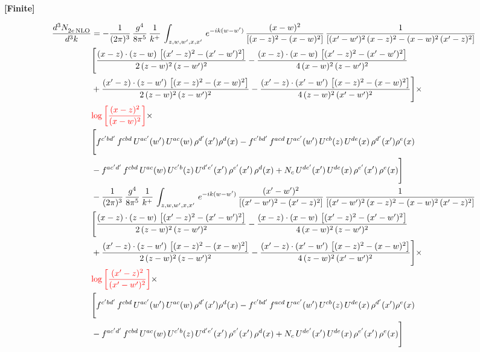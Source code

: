 \documentclass[9pt]{article}
\numberwithin{equation}{section}
\begin{document}
\par\smallskip\noindent\textbf{[Finite]}\par\nobreak
\begin{align}
 \frac{d^{3}N_{2e\,\rm NLO}^{\rm}}{d^{3}k}  & =   -\frac{1}{(2\pi)^{3}}\, \frac{g^{4}}{8\pi^{5}}\,\frac{1}{k^{+}}\,\int_{z,w,w^{\prime},x,x'}\, e^{-ik(w-w^{\prime})}\,\frac{(x-w)^{2}}{\left[(x-z)^{2}-(x-w)^{2}\right]}\, \frac{1}{\left[(x'-w')^{2}\, (x-z)^{2} - (x-w)^{2}\, (x'-z)^{2}\right]} \notag \\ & \Bigg[\frac{(x-z)\cdot (z-w)\, \left[(x'-z)^{2}-(x'-w')^{2}\right]}{2\, (z-w)^{2}\, (z-w')^{2}}  - \frac{(x-z)\cdot (x-w)\,\left[(x'-z)^{2}-(x'-w')^{2}\right] }{4\,(x-w)^{2}\,(z-w')^{2}}\notag \\ & +\frac{(x'-z)\cdot (z-w')\, \left[(x-z)^{2}-(x-w)^{2}\right]}{2\, (z-w)^{2}\, (z-w')^{2}}-\frac{(x'-z)\cdot (x'-w')\, \left[(x-z)^{2}-(x-w)^{2}\right]}{4\, (z-w)^{2}\,(x'-w')^{2}}\Bigg]\times\,\notag \\ & {\color{red}\log{\left[\frac{(x-z)^{2}}{(x-w)^{2}}\right]}}\times\,\notag \\ & \Bigg[f^{c'bd'}\,f^{cbd}\, U^{ac'}(w')\,U^{ac}(w)\,\rho^{d'}(x')\rho^{d}(x)- f^{c'bd'}\,f^{acd}\,U^{ac'}(w')\,U^{cb}(z)\,U^{de}(x)\,\rho^{d'}(x')\rho^{e}(x) \notag \\ & -f^{ac'd'}\,f^{cbd}\,U^{ac}(w)\,U^{c'b}(z)\,U^{d'e'}(x')\,\rho^{e'}(x')\,\rho^{d}(x) +N_{c}\,U^{de'}(x')\,U^{de}(x)\,\rho^{e'}(x')\,\rho^{e}(x)\Bigg] \notag \\
& -\frac{1}{(2\pi)^{3}}\, \frac{g^{4}}{8\pi^{5}}\,\frac{1}{k^{+}}\,\int_{z,w,w^{\prime},x,x'}\, e^{-ik(w-w^{\prime})}\, \frac{(x'-w')^{2}}{\left[(x'-w')^{2}-(x'-z)^{2}\right]}\, \frac{1}{\left[(x'-w')^{2}\, (x-z)^{2} - (x-w)^{2}\, (x'-z)^{2}\right]}  \notag \\ & \Bigg[\frac{(x-z)\cdot (z-w)\, \left[(x'-z)^{2}-(x'-w')^{2}\right]}{2\, (z-w)^{2}\, (z-w')^{2}}  - \frac{(x-z)\cdot (x-w)\,\left[(x'-z)^{2}-(x'-w')^{2}\right] }{4\,(x-w)^{2}\,(z-w')^{2}}\notag \\ & +\frac{(x'-z)\cdot (z-w')\, \left[(x-z)^{2}-(x-w)^{2}\right]}{2\, (z-w)^{2}\, (z-w')^{2}}-\frac{(x'-z)\cdot (x'-w')\, \left[(x-z)^{2}-(x-w)^{2}\right]}{4\, (z-w)^{2}\,(x'-w')^{2}}\Bigg]\times\,\notag \\ & {\color{red}\log{\left[\frac{(x'-z)^{2}}{(x'-w')^{2}}\right]}}\times\notag \\ & \Bigg[f^{c'bd'}\,f^{cbd}\, U^{ac'}(w')\,U^{ac}(w)\,\rho^{d'}(x')\rho^{d}(x)- f^{c'bd'}\,f^{acd}\,U^{ac'}(w')\,U^{cb}(z)\,U^{de}(x)\,\rho^{d'}(x')\rho^{e}(x) \notag \\ & -f^{ac'd'}\,f^{cbd}\,U^{ac}(w)\,U^{c'b}(z)\,U^{d'e'}(x')\,\rho^{e'}(x')\,\rho^{d}(x) +N_{c}\,U^{de'}(x')\,U^{de}(x)\,\rho^{e'}(x')\,\rho^{e}(x)\Bigg]
\end{align}
\end{document}
